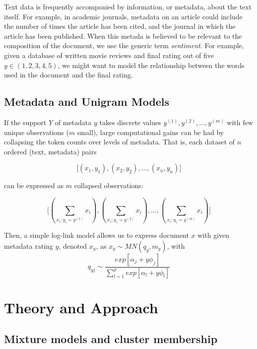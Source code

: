 \documentclass[12pt]{article}
\begin{document}
Text data is frequently accompanied by information, or metadata, about
the text itself. For example, in academic journals, metadata on an
article could include the number of times the article has been cited,
and the journal in which the article has been published. When this
metada is believed to be relevant to the composition of the document, we
use the generic term \emph{sentiment}. For example, given a database of
written movie reviews and final rating out of five $y \in (1,2,3,4,5)$,
we might want to model the relationship between the words used in the
document and the final rating.

\subsection{Metadata and Unigram Models}

If the support $Y$ of metadata $y$ takes discrete values $y^{(1)}, y^{(2)}, \dots, y^{(m)}$ with few unique observations ($m$ small), large computational gains can be had by collapsing the token counts over levels of metadata.  That is, each dataset of $n$ ordered (text, metadata) pairs

\begin{equation}
\big[ (x_1,y_1), (x_2,y_2), \dots , (x_n,y_n) \big]
\end{equation}

can be expressed as $m$ collapsed observations:

\begin{equation}
\big[  (\sum_{x_i : y_i = y^{(1)}}{x_i}) , (\sum_{x_i : y_i = y^{(2)}}{x_i}), \dots,  (\sum_{x_i : y_i = y^{(m)}}{x_i})  \big]
\end{equation}

Then, a simple log-link model allows us to express document $x$ with given metadata rating $y$,
denoted $x_y$, as $x_y \sim MN(q_y,m_y)$, with
\begin{equation}
q_{yj} \sim \frac{exp[\alpha_j + y \phi_j]}{\sum_{l=1}^{p} exp[\alpha_l + y \phi_l]}
\end{equation}

\section{Theory and Approach}\label{theory-and-approach}

\subsection{Mixture models and cluster
membership}\label{mixture-models-and-cluster-membership}
\end{document}

